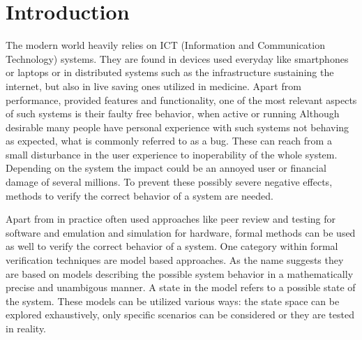 \documentclass[preview]{standalone}
\begin{document}
\section{Introduction}
	
The modern world heavily relies on ICT (Information and Communication Technology) systems. They are found in devices used everyday like smartphones or laptops or in distributed systems such as the infrastructure sustaining the internet, but also in live saving ones utilized in medicine. Apart from performance, provided features and functionality, one of the most relevant aspects of such systems is their faulty free behavior, when active or running Although desirable many people have personal experience with such systems not behaving as expected, what is commonly referred to as a bug. These can reach from a small disturbance in the user experience to inoperability of the whole system. Depending on the system the impact could be an annoyed user or financial damage of several millions. To prevent these possibly severe negative effects, methods to verify the correct behavior of a system are needed.


Apart from in practice often used approaches like peer review and testing for software and emulation and simulation for hardware, formal methods can be used as well to verify the correct behavior of a system. One category within formal verification techniques are model based approaches. As the name suggests they are based on models describing the possible system behavior in a mathematically precise and unambigous manner. A state in the model refers to a possible state of the system. These models can be utilized various ways: the state space can be explored exhaustively, only specific scenarios can be considered or they are tested in reality.
\end{document}
